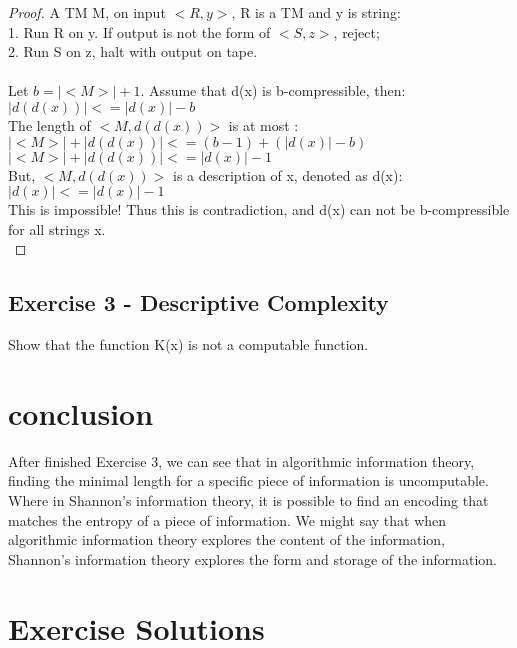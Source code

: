 \documentclass[12pt]{article}
\begin{document}
\begin{proof}
A TM M, on input $<R,y>$, R is a TM and y is string:\\
    1. Run R on y. If output is not the form of $<S,z>$, reject;\\
    2. Run S on z, halt with output on tape.\\
\\
Let $b = |<M>| + 1$. Assume that d(x) is b-compressible, then:\\
    $|d(d(x))| <= |d(x)| - b$\\
The length of $<M, d(d(x))>$ is at most :\\
    $|<M>| + |d(d(x))| <= (b-1) + (|d(x)|-b)$\\
    $|<M>| + |d(d(x))| <= |d(x)| - 1$\\
But, $<M, d(d(x))>$ is a description of x, denoted as d(x):\\
    $|d(x)| <= |d(x)| - 1$\\
This is impossible! Thus this is contradiction, and d(x) can not be b-compressible for all strings x.\\
\end{proof}

\subsection{Exercise 3 - Descriptive Complexity}
Show that the function K(x) is not a computable function.

\section{conclusion}
After finished Exercise 3, we can see that in algorithmic information theory, finding the minimal length for a specific piece of information is uncomputable. Where in Shannon's information theory, it is possible to find an encoding that matches the entropy of a piece of information. We might say that when algorithmic information theory explores the content of the information, Shannon's information theory explores the form and storage of the information.





\section{Exercise Solutions}
\end{document}
